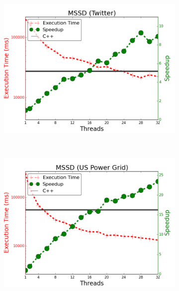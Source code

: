 \begin{figure}[]
\begin{subfigure}[b]{\plotsize\textwidth}
        \end{subfigure} \\
        \begin{subfigure}[b]{\plotsize\textwidth}
                \includegraphics[width=\textwidth]{experiments/scalability/scale-shortest-twitter.png}
                \label{fig:implementation:scale_sssp_twitter}
        \end{subfigure}
        ~
        \begin{subfigure}[b]{\plotsize\textwidth}
                \includegraphics[width=\textwidth]{experiments/scalability/scale-shortest-uspowergrid.png}

\end{subfigure}
\end{figure}
